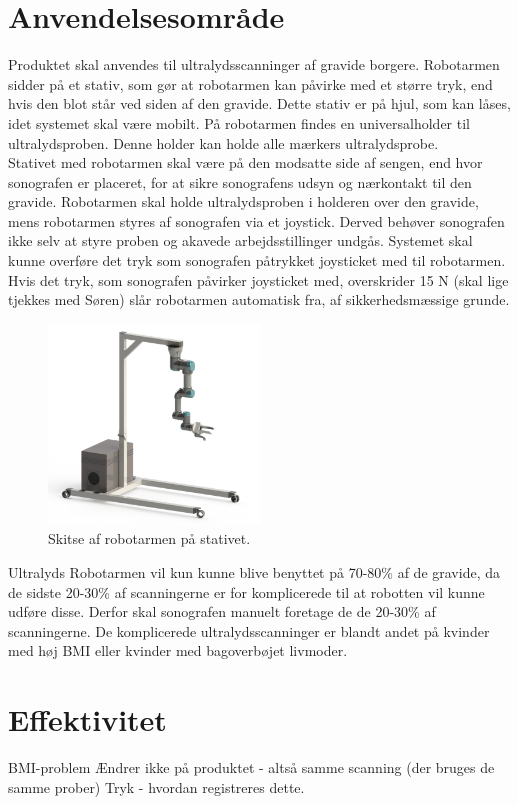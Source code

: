 \section{Anvendelsesområde}
Produktet skal anvendes til ultralydsscanninger af gravide borgere. Robotarmen sidder på et stativ, som gør at robotarmen kan påvirke med et større tryk, end hvis den blot står ved siden af den gravide. Dette stativ er på hjul, som kan låses, idet systemet skal være mobilt. På robotarmen findes en universalholder til ultralydsproben. Denne holder kan holde alle mærkers ultralydsprobe. \\
Stativet med robotarmen skal være på den modsatte side af sengen, end hvor sonografen er placeret, for at sikre sonografens udsyn og nærkontakt til den gravide.
Robotarmen skal holde ultralydsproben i holderen over den gravide, mens robotarmen styres af sonografen via et joystick. Derved behøver sonografen ikke selv at styre proben og akavede arbejdsstillinger undgås. 
Systemet skal kunne overføre det tryk som sonografen påtrykket joysticket med til robotarmen.
Hvis det tryk, som sonografen påvirker joysticket med, overskrider 15 N (skal lige tjekkes med Søren) slår robotarmen automatisk fra, af sikkerhedsmæssige grunde. 
\begin{figure}[H]\centering
	\includegraphics[width = 0.5\textwidth]{Figurer/StativMedUR3Render.png}
	\caption{Skitse af robotarmen på stativet.}
	\label{udstyrHorsens}
\end{figure}
Ultralyds Robotarmen vil kun kunne blive benyttet på 70-80\% af de gravide, da de sidste 20-30\% af scanningerne er for komplicerede til at robotten vil kunne udføre disse. Derfor skal sonografen manuelt foretage de de 20-30\% af scanningerne. De komplicerede ultralydsscanninger er blandt andet på kvinder med høj BMI eller kvinder med bagoverbøjet livmoder. 
\section{Effektivitet}
BMI-problem
Ændrer ikke på produktet - altså samme scanning (der bruges de samme prober)
Tryk - hvordan registreres dette.
